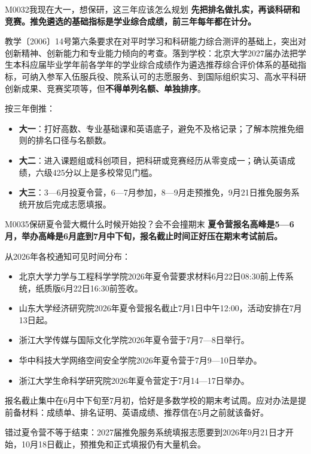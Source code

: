 \begin{qa}{M0032}{我现在大一，想保研，这三年应该怎么规划}
\textbf{先把排名做扎实，再谈科研和竞赛。推免遴选的基础指标是学业综合成绩，前三年每年都在计分。}

教学〔2006〕14号第六条要求在对平时学习和科研能力综合测评的基础上，突出对创新精神、创新能力和专业能力倾向的考查。落到学校：北京大学2027届办法把学生本科应届毕业学年前各学年的学业综合成绩作为遴选推荐综合评价体系的基础指标，可纳入参军入伍服兵役、院系认可的志愿服务、到国际组织实习、高水平科研创新成果、竞赛奖项等，但\textbf{不得单列名额、单独排序}。

按三年倒推：

\begin{itemize}
  \item \textbf{大一}：打好高数、专业基础课和英语底子，避免不及格记录；了解本院推免细则的排名口径与名额数。
  \item \textbf{大二}：进入课题组或科创项目，把科研或竞赛经历从零变成一；确认英语成绩，六级425分以上是多校常见门槛。
  \item \textbf{大三}：3—6月投夏令营，6—7月参加，8—9月走预推免，9月21日推免服务系统开放后完成志愿填报。
\end{itemize}
\end{qa}

\begin{qa}{M0035}{保研夏令营大概什么时候开始投？会不会撞期末}
\textbf{夏令营报名高峰是5—6月，举办高峰是6月底到7月中下旬，报名截止时间正好压在期末考试前后。}

从2026年各校通知可见时间分布：

\begin{itemize}
  \item 北京大学力学与工程科学学院2026年夏令营要求材料6月22日08:30前上传系统，纸质版6月22日16:30前签收。
  \item 山东大学经济研究院2026年夏令营报名截止7月1日中午12:00，活动安排在7月13日起。
  \item 浙江大学传媒与国际文化学院2026年夏令营于7月7—8日举行。
  \item 华中科技大学网络空间安全学院2026年夏令营于7月9—10日举办。
  \item 浙江大学生命科学研究院2026年夏令营定于7月14—17日举办。
\end{itemize}

报名截止集中在6月中下旬至7月初，恰好是多数学校的期末考试周。应对办法是提前备材料：成绩单、排名证明、英语成绩、推荐信在5月之前就该备好。

错过夏令营不等于结束：2027届推免服务系统填报志愿要到2026年9月21日才开始，10月18日截止，预推免和正式填报仍有大量机会。
\end{qa}

